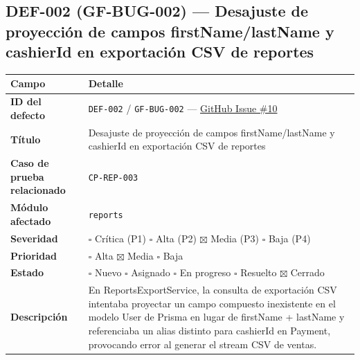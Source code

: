 \documentclass[10pt,a4paper]{article}
\newcounter{none}
\begin{document}
\endgroup\medskip


\subsection{DEF-002 (GF-BUG-002) --- Desajuste de proyección de campos firstName/lastName y cashierId en exportación CSV de reportes}\label{def-002-gf-bug-002--desajuste-de-proyecciuxf3n-de-campos-firstnamelastname-y-cashierid-en-exportaciuxf3n-csv-de-reportes}

\begingroup\singlespacing\footnotesize\setlength{\parskip}{0pt}

{\def\LTcaptype{none} %
\begin{longtable}[]{@{}
  >{\raggedright\arraybackslash}p{}
  >{\raggedright\arraybackslash}p{}@{}}
\toprule\noalign{}
\begin{minipage}[b]{\linewidth}\raggedright
Campo
\end{minipage} & \begin{minipage}[b]{\linewidth}\raggedright
Detalle
\end{minipage} \\
\midrule\noalign{}
\endhead
\bottomrule\noalign{}
\endlastfoot
\textbf{ID del defecto} & \texttt{DEF-{}\allowbreak{}002} / \texttt{GF-{}\allowbreak{}BUG-{}\allowbreak{}002} --- \href{https://github.com/H3llz07/GastroForge-Testing/issues/10}{GitHub Issue \#10} \\
\textbf{Título} & Desajuste de proyección de campos firstName/lastName y cashierId en exportación CSV de reportes \\
\textbf{Caso de prueba relacionado} & \texttt{CP-{}\allowbreak{}REP-{}\allowbreak{}003} \\
\textbf{Módulo afectado} & \texttt{reports} \\
\textbf{Severidad} & \ensuremath{\square} Crítica (P1) \ensuremath{\square} Alta (P2) \ensuremath{\boxtimes} Media (P3) \ensuremath{\square} Baja (P4) \\
\textbf{Prioridad} & \ensuremath{\square} Alta \ensuremath{\boxtimes} Media \ensuremath{\square} Baja \\
\textbf{Estado} & \ensuremath{\square} Nuevo \ensuremath{\square} Asignado \ensuremath{\square} En progreso \ensuremath{\square} Resuelto \ensuremath{\boxtimes} Cerrado \\
\textbf{Descripción} & En ReportsExportService, la consulta de exportación CSV intentaba proyectar un campo compuesto inexistente en el modelo User de Prisma en lugar de firstName + lastName y referenciaba un alias distinto para cashierId en Payment, provocando error al generar el stream CSV de ventas. \\

\end{longtable}}
\end{document}
